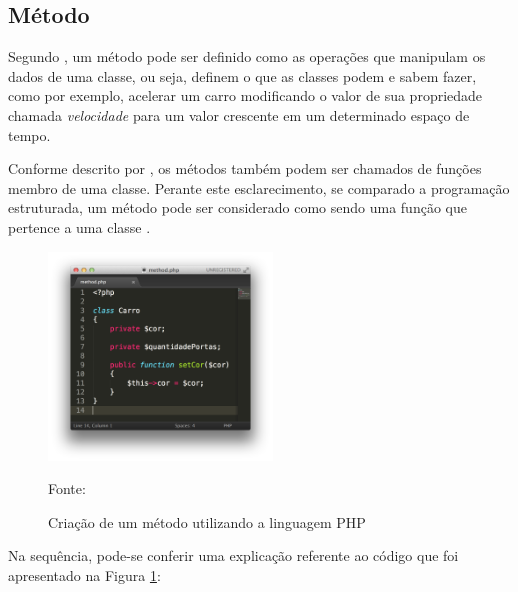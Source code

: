\subsection{Método}

Segundo , um
método pode ser definido como as operações que manipulam os dados de uma
classe, ou seja, definem o que as classes podem e sabem fazer, como por exemplo,
acelerar um carro modificando o valor de sua propriedade chamada
\textit{velocidade} para um valor crescente em um determinado espaço de tempo.

Conforme descrito por , os métodos também podem ser
chamados de funções membro de uma classe. Perante este esclarecimento, se
comparado a programação estruturada, um método pode ser considerado como
sendo uma função que pertence a uma classe \cite{programmingPhp}.

\begin{figure}[h!tb]
	\caption{Criação de um método utilizando a linguagem PHP}
	\label{fig:metodo}

	\centering
	\includegraphics[width=0.53\textwidth]{images/method.png}

	\centering
	\footnotesize Fonte: \fonteOAutor
\end{figure}

\FloatBarrier 	%

Na sequência, pode-se conferir uma explicação referente ao código que foi
apresentado na Figura \ref{fig:metodo}:

